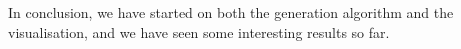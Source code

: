 
In conclusion, we have started on both the generation algorithm and the visualisation, and we have seen some interesting results so far.

